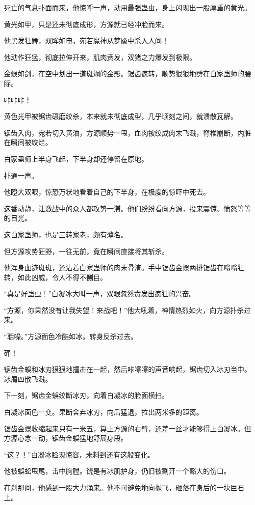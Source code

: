 \begin{this_body}
死亡的气息扑面而来，他惊呼一声，动用最强蛊虫，身上闪现出一股厚重的黄光。

黄光如甲，只是还未彻底成形，方源就已经冲脸而来。

他黑发狂舞，双眸如电，宛若魔神从梦魇中杀入人间！

他动作狂猛，彻底拉伸开来，肌肉贲发，双猪之力爆发到极限。

金蜈如剑，在空中划出一道斑斓的金影。锯齿疯转，顺势狠狠地劈在白家蛊师的腰际。

咔咔咔！

黄色光甲被锯齿碾磨绞杀，本来就未彻底成型，几乎顷刻之间，就溃散瓦解。

锯齿入肉，宛若切入黄油，方源顺势一甩，血肉被绞成肉末飞溅，脊椎崩断，内脏在瞬间被绞烂。

白家蛊师上半身飞起，下半身却还停留在原地。

扑通一声。

他瞪大双眼，惊恐万状地看着自己的下半身，在极度的惊吓中死去。

这番动静，让激战中的众人都攻势一滞。他们纷纷看向方源，投来震惊、愤怒等等的目光。

这白家蛊师，也是三转家老，颇有薄名。

但方源攻势狂野，一往无前，竟在瞬间直接将其斩杀。

他浑身血迹斑斑，还沾着白家蛊师的肉末骨渣。手中锯齿金蜈两排锯齿在嗡嗡狂转，如此凶威，令人不得不侧目。

“真是好蛊虫！”白凝冰大叫一声，双眼忽然贲发出疯狂的兴奋。

“方源，你果然没有让我失望！来战吧！”他大吼着，神情热烈如火，向方源扑杀过来。

“聒噪。”方源面色冷酷如冰。转身反杀过去。

砰！

锯齿金蜈和冰刃狠狠地撞击在一起，然后咔嚓嚓的声音响起，锯齿切入冰刃当中。冰屑四散飞溅。

下一刻，锯齿金蜈绞断冰刃，向着白凝冰的脸面横扫。

白凝冰面色一变。果断舍弃冰刃，向后猛退，拉出两米多的距离。

锯齿金蜈收缩起来只有一米五，算上方源的右臂，还差一丝才能够得上白凝冰。但方源心念一动，锯齿金蜈猛地舒展身段。

“这？！”白凝冰脸现惊容，未料到还有这般变化。

他被蜈蚣甩尾，击中胸膛。饶是有冰肌护身，仍旧被割开一个豁大的伤口。

在刹那间，他感到一股大力涌来。他不可避免地向抛飞，砸落在身后的一块巨石上。


\end{this_body}

